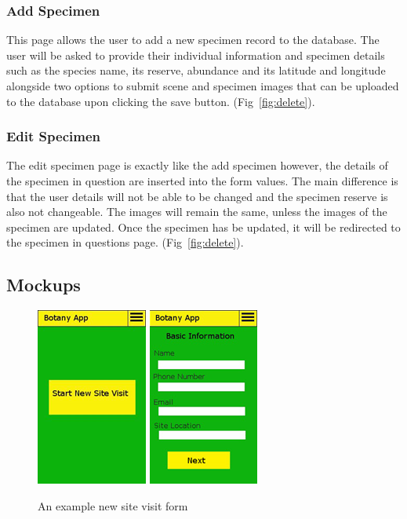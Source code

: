  \subsubsection{ Add Specimen}
     This page allows the user to add a new specimen record to the database. The user will be asked to provide their individual information and specimen details such as the species name, its reserve, abundance and its latitude and longitude alongside two options to submit scene and specimen images that can be uploaded to the database upon clicking the save button.  (Fig~\ref{fig:delete}).

 \subsubsection{Edit Specimen}
        The edit specimen page is exactly like the add specimen however, the details of the specimen in question are inserted into the form values. The main difference is that the user details will not be able to be changed and the specimen reserve is also not changeable. The images will remain the same, unless the images of the specimen are updated. Once the specimen has be updated, it will be redirected to the specimen in questions page.  (Fig~\ref{fig:delete}).





    \subsection{Mockups}

        \begin{figure}
            \centering
            \includegraphics[scale=1]{uiDesign/botanyAppNewSiteVisit1.png}
            \includegraphics[scale=1]{uiDesign/botanyAppNewSiteVisit2.png}
            \caption{An example new site visit form}
            \label{fig:newSiteVisit}
        \end{figure}

